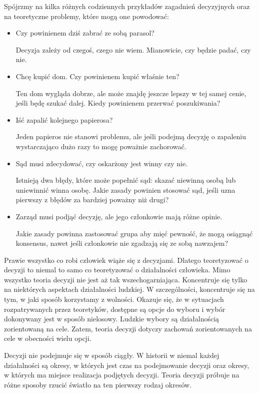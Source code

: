 Spójrzmy na kilka różnych codziennych przykładów zagadnień decyzyjnych oraz na 
teoretyczne problemy, które mogą one powodować:
\begin{itemize}

\item Czy powinienem dziś zabrać ze sobą parasol?

Decyzja zależy od czegoś, czego nie wiem. Mianowicie, czy będzie padać, czy nie.

\item  Chcę kupić dom. Czy powinienem kupić właśnie ten?

Ten dom wygląda dobrze, ale może znajdę jeszcze lepszy w tej samej cenie, jeśli 
będę szukać dalej. Kiedy powinienem przerwać poszukiwania?

\item Iść zapalić kolejnego papierosa?

Jeden papieros nie stanowi problemu, ale jeśli podejmą decyzję o zapaleniu wystarczająco 
dużo razy to mogę poważnie zachorować.

\item Sąd musi zdecydować, czy oskarżony jest winny czy nie.

Istnieją dwa błędy, które może popełnić sąd: skazać niewinną osobą lub uniewinnić 
winna osobę. Jakie zasady powinien stosować sąd, jeśli uzna pierwszy z błędów za 
bardziej poważny niż drugi?

\item Zarząd musi podjąć decyzję, ale jego członkowie mają różne opinie.

Jakie zasady powinna zastosować grupa aby mięć pewność, że mogą osiągnąć konsensus, 
nawet jeśli członkowie nie zgadzają się ze sobą nawzajem?

\end{itemize}

Prawie wszystko co robi człowiek wiąże się z decyzjami. Dlatego teoretyzować o 
decyzji to niemal to samo co teoretyzować o działalności człowieka. Mimo 
wszystko teoria decyzji nie jest aż tak wszechogarniająca. Koncentruje się 
tylko na niektórych aspektach działalności ludzkiej. W szczególności, 
koncentruje się na tym, w jaki sposób korzystamy z wolności. Okazuje się, że w 
sytuacjach rozpatrywanych przez teoretyków, dostępne są opcje do wyboru i wybór 
dokonywany jest w sposób nielosowy. Ludzkie wybory są działalnością 
zorientowaną na cele. Zatem, teoria decyzji dotyczy zachowań zorientowanych na 
cele w obecności wielu opcji.

Decyzji nie podejmuje się w sposób ciągły. W historii w niemal każdej 
działalności są okresy, w których jest czas na podejmowanie decyzji oraz 
okresy, w których ma miejsce realizacja podjętych decyzji. Teoria decyzji 
próbuje na różne sposoby rzucić światło na ten pierwszy rodzaj okresów.

